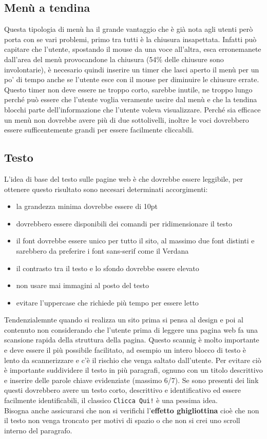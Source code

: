 \subsection{Menù a tendina}
Questa tipologia di menù ha il grande vantaggio che è già nota agli utenti però porta con se vari problemi, primo tra tutti è la chiusura insapettata. Infatti può capitare che l'utente, spostando il mouse da una voce all'altra, esca erronemanete dall'area del menù provocandone la chiusura (54\% delle chiusure sono involontarie), è necesario quindi inserire un timer che lasci aperto il menù per un po' di tempo anche se l'utente esce con il mouse per diminuire le chiusure errate.
Questo timer non deve essere ne troppo corto, sarebbe inutile, ne troppo lungo perché può essere che l'utente voglia veramente uscire dal menù e che la tendina blocchi parte dell'informazione che l'utente voleva visualizzare.
Perché sia efficace un menù non dovrebbe avere più di due sottolivelli, inoltre le voci dovrebbero essere sufficentemente grandi per essere facilmente cliccabili.

\subsection{Testo}
L'idea di base del testo sulle pagine web è che dovrebbe essere leggibile, per ottenere questo risultato sono necesari determinati accorgimenti:
\begin{itemize}
\item la grandezza minima dovrebbe essere di 10pt
\item dovrebbero essere disponibili dei comandi per ridimensionare il testo
\item il font dovrebbe essere unico per tutto il sito, al massimo due font distinti e sarebbero da preferire i font sans-serif come il Verdana
\item il contrasto tra il testo e lo sfondo dovrebbe essere elevato
\item non usare mai immagini al posto del testo
\item evitare l'uppercase che richiede più tempo per essere letto
\end{itemize}
Tendenzialemnte quando si realizza un sito prima si pensa al design e poi al contenuto non considerando che l'utente prima di leggere una pagina web fa una scansione rapida della struttura della pagina.
Questo scannig è molto importante e deve essere il più possibile facilitato, ad esempio un intero blocco di testo è lento da scannerizzare e c'è il rischio che venga saltato dall'utente.
Per evitare ciò è importante suddividere il testo in più paragrafi, ognuno con un titolo descrittivo e inserire delle parole chiave evidenziate (massimo 6/7).
Se sono presenti dei link questi dovrebbero avere un testo corto, descrittivo e identificativo ed essere facilmente identificabili, il classico \texttt{Clicca Qui!} è una pessima idea.\\
Bisogna anche assicurarsi che non si verifichi l'\textbf{effetto ghigliottina} cioè che non il testo non venga troncato per motivi di spazio o che non si crei uno scroll interno del paragrafo.

